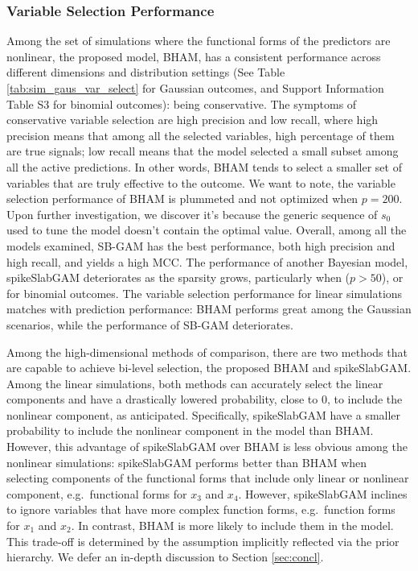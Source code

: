 \documentclass[AMA,STIX1COL,]{WileyNJD-v2}
\begin{document}
\subsubsection{Variable Selection Performance}

Among the set of simulations where the functional forms of the
predictors are nonlinear, the proposed model, BHAM, has a consistent
performance across different dimensions and distribution settings (See
Table \ref{tab:sim_gaus_var_select} for Gaussian outcomes, and Support
Information Table S3 for binomial outcomes): being conservative. The
symptoms of conservative variable selection are high precision and low
recall, where high precision means that among all the selected
variables, high percentage of them are true signals; low recall means
that the model selected a small subset among all the active predictions.
In other words, BHAM tends to select a smaller set of variables that are
truly effective to the outcome. We want to note, the variable selection
performance of BHAM is plummeted and not optimized when \(p=200\). Upon
further investigation, we discover it's because the generic sequence of
\(s_0\) used to tune the model doesn't contain the optimal value.
Overall, among all the models examined, SB-GAM has the best performance,
both high precision and high recall, and yields a high MCC. The
performance of another Bayesian model, spikeSlabGAM deteriorates as the
sparsity grows, particularly when (\(p>50\)), or for binomial outcomes.
The variable selection performance for linear simulations matches with
prediction performance: BHAM performs great among the Gaussian
scenarios, while the performance of SB-GAM deteriorates.

Among the high-dimensional methods of comparison, there are two methods
that are capable to achieve bi-level selection, the proposed BHAM and
spikeSlabGAM. Among the linear simulations, both methods can accurately
select the linear components and have a drastically lowered probability,
close to 0, to include the nonlinear component, as anticipated.
Specifically, spikeSlabGAM have a smaller probability to include the
nonlinear component in the model than BHAM. However, this advantage of
spikeSlabGAM over BHAM is less obvious among the nonlinear simulations:
spikeSlabGAM performs better than BHAM when selecting components of the
functional forms that include only linear or nonlinear component,
e.g.~functional forms for \(x_3\) and \(x_4\). However, spikeSlabGAM
inclines to ignore variables that have more complex function forms,
e.g.~function forms for \(x_1\) and \(x_2\). In contrast, BHAM is more
likely to include them in the model. This trade-off is determined by the
assumption implicitly reflected via the prior hierarchy. We defer an
in-depth discussion to Section \ref{sec:concl}.
\end{document}
